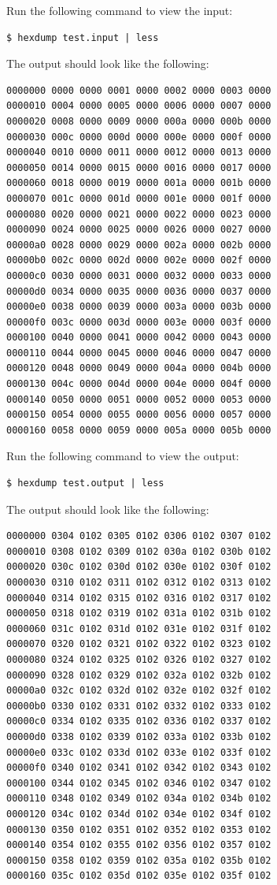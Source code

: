 \noindent Run the following command to view the input:
\begin{verbatim}
$ hexdump test.input | less
\end{verbatim}
 The output should look like the following:
\begin{verbatim}
0000000 0000 0000 0001 0000 0002 0000 0003 0000
0000010 0004 0000 0005 0000 0006 0000 0007 0000
0000020 0008 0000 0009 0000 000a 0000 000b 0000
0000030 000c 0000 000d 0000 000e 0000 000f 0000
0000040 0010 0000 0011 0000 0012 0000 0013 0000
0000050 0014 0000 0015 0000 0016 0000 0017 0000
0000060 0018 0000 0019 0000 001a 0000 001b 0000
0000070 001c 0000 001d 0000 001e 0000 001f 0000
0000080 0020 0000 0021 0000 0022 0000 0023 0000
0000090 0024 0000 0025 0000 0026 0000 0027 0000
00000a0 0028 0000 0029 0000 002a 0000 002b 0000
00000b0 002c 0000 002d 0000 002e 0000 002f 0000
00000c0 0030 0000 0031 0000 0032 0000 0033 0000
00000d0 0034 0000 0035 0000 0036 0000 0037 0000
00000e0 0038 0000 0039 0000 003a 0000 003b 0000
00000f0 003c 0000 003d 0000 003e 0000 003f 0000
0000100 0040 0000 0041 0000 0042 0000 0043 0000
0000110 0044 0000 0045 0000 0046 0000 0047 0000
0000120 0048 0000 0049 0000 004a 0000 004b 0000
0000130 004c 0000 004d 0000 004e 0000 004f 0000
0000140 0050 0000 0051 0000 0052 0000 0053 0000
0000150 0054 0000 0055 0000 0056 0000 0057 0000
0000160 0058 0000 0059 0000 005a 0000 005b 0000
\end{verbatim}

\noindent Run the following command to view the output: \\
\begin{verbatim}
$ hexdump test.output | less
\end{verbatim}\medskip
 The output should look like the following:
\begin{verbatim}
0000000 0304 0102 0305 0102 0306 0102 0307 0102
0000010 0308 0102 0309 0102 030a 0102 030b 0102
0000020 030c 0102 030d 0102 030e 0102 030f 0102
0000030 0310 0102 0311 0102 0312 0102 0313 0102
0000040 0314 0102 0315 0102 0316 0102 0317 0102
0000050 0318 0102 0319 0102 031a 0102 031b 0102
0000060 031c 0102 031d 0102 031e 0102 031f 0102
0000070 0320 0102 0321 0102 0322 0102 0323 0102
0000080 0324 0102 0325 0102 0326 0102 0327 0102
0000090 0328 0102 0329 0102 032a 0102 032b 0102
00000a0 032c 0102 032d 0102 032e 0102 032f 0102
00000b0 0330 0102 0331 0102 0332 0102 0333 0102
00000c0 0334 0102 0335 0102 0336 0102 0337 0102
00000d0 0338 0102 0339 0102 033a 0102 033b 0102
00000e0 033c 0102 033d 0102 033e 0102 033f 0102
00000f0 0340 0102 0341 0102 0342 0102 0343 0102
0000100 0344 0102 0345 0102 0346 0102 0347 0102
0000110 0348 0102 0349 0102 034a 0102 034b 0102
0000120 034c 0102 034d 0102 034e 0102 034f 0102
0000130 0350 0102 0351 0102 0352 0102 0353 0102
0000140 0354 0102 0355 0102 0356 0102 0357 0102
0000150 0358 0102 0359 0102 035a 0102 035b 0102
0000160 035c 0102 035d 0102 035e 0102 035f 0102
\end{verbatim}

